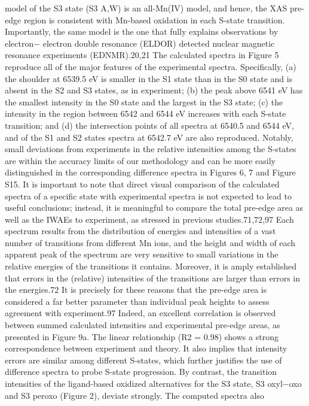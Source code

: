 \documentclass{article}
\begin{document}
model of the S3 state (S3
A,W) is an all-Mn(IV) model, and
hence, the XAS pre-edge region is consistent with Mn-based
oxidation in each S-state transition. Importantly, the same
model is the one that fully explains observations by electron−
electron double resonance (ELDOR) detected nuclear
magnetic resonance experiments (EDNMR).20,21
The calculated spectra in Figure 5 reproduce all of the major
features of the experimental spectra. Specifically, (a) the
shoulder at 6539.5 eV is smaller in the S1 state than in the S0
state and is absent in the S2 and S3 states, as in experiment; (b)
the peak above 6541 eV has the smallest intensity in the S0
state and the largest in the S3 state; (c) the intensity in the
region between 6542 and 6544 eV increases with each S-state
transition; and (d) the intersection points of all spectra at
6540.5 and 6544 eV, and of the S1 and S2 states spectra at
6542.7 eV are also reproduced. Notably, small deviations from
experiments in the relative intensities among the S-states are
within the accuracy limits of our methodology and can be
more easily distinguished in the corresponding difference
spectra in Figures 6, 7 and Figure S15.
It is important to note that direct visual comparison of the
calculated spectra of a specific state with experimental spectra
is not expected to lead to useful conclusions; instead, it is
meaningful to compare the total pre-edge area as well as the
IWAEs to experiment, as stressed in previous studies.71,72,97
Each spectrum results from the distribution of energies and
intensities of a vast number of transitions from different Mn
ions, and the height and width of each apparent peak of the
spectrum are very sensitive to small variations in the relative
energies of the transitions it contains. Moreover, it is amply
established that errors in the (relative) intensities of the
transitions are larger than errors in the energies.72 It is
precisely for these reasons that the pre-edge area is considered
a far better parameter than individual peak heights to assess
agreement with experiment.97 Indeed, an excellent correlation
is observed between summed calculated intensities and
experimental pre-edge areas, as presented in Figure 9a. The
linear relationship (R2 = 0.98) shows a strong correspondence
between experiment and theory. It also implies that intensity
errors are similar among different S-states, which further
justifies the use of difference spectra to probe S-state
progression. By contrast, the transition intensities of the
ligand-based oxidized alternatives for the S3 state, S3
oxyl−oxo and
S3
peroxo (Figure 2), deviate strongly. The computed spectra also
\end{document}
